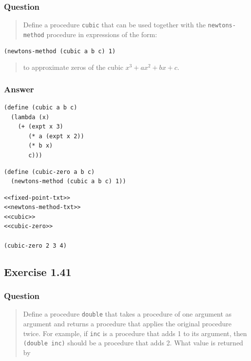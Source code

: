 \documentclass[final,fleqn,titlepage,twoside]{article}
\begin{document}
\subsubsection{Question}
\label{sec:org0240ef3}
\begin{quote}
Define a procedure \texttt{cubic} that can be used together with the
\texttt{newtons-method} procedure in expressions of the form:
\end{quote}

\begin{verbatim}
(newtons-method (cubic a b c) 1)
\end{verbatim}

\begin{quote}
to approximate zeros of the cubic \(x^3 + ax^2 + bx + c\).
\end{quote}

\subsubsection{Answer}
\label{sec:orgb3db7cc}
\begin{verbatim}
(define (cubic a b c)
  (lambda (x)
    (+ (expt x 3)
       (* a (expt x 2))
       (* b x)
       c)))
\end{verbatim}

\begin{verbatim}
(define (cubic-zero a b c)
  (newtons-method (cubic a b c) 1))
\end{verbatim}

\begin{verbatim}
<<fixed-point-txt>>
<<newtons-method-txt>>
<<cubic>>
<<cubic-zero>>

(cubic-zero 2 3 4)
\end{verbatim}

\subsection{Exercise 1.41}
\label{sec:org98e4cca}
\subsubsection{Question}
\label{sec:orgde45a3d}
\begin{quote}
Define a procedure \texttt{double} that takes a procedure of one argument as
argument and returns a procedure that applies the original procedure twice. For
example, if \texttt{inc} is a procedure that adds 1 to its argument, then
\texttt{(double inc)} should be a procedure that adds 2. What value is
returned by
\end{quote}
\end{document}
